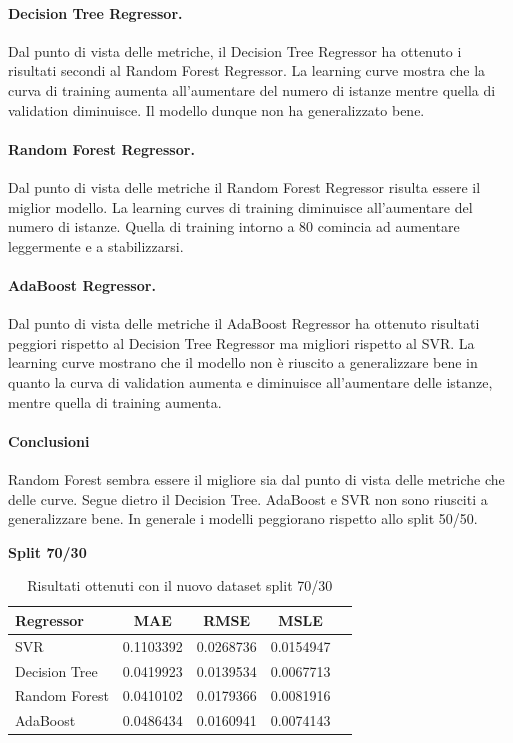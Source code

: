 \paragraph{\textbf{Decision Tree Regressor}.}
Dal punto di vista delle metriche, il Decision Tree Regressor ha ottenuto i risultati secondi al Random Forest Regressor. 
La learning curve mostra che la curva di training aumenta all'aumentare del numero di istanze mentre quella di validation diminuisce. Il modello dunque non ha generalizzato bene.
\paragraph{\textbf{Random Forest Regressor}.}
Dal punto di vista delle metriche il Random Forest Regressor risulta essere il miglior modello.
La learning curves di training diminuisce all'aumentare del numero di istanze. Quella di training intorno a 80 comincia ad aumentare leggermente e a stabilizzarsi.
\paragraph{\textbf{AdaBoost Regressor}.}
Dal punto di vista delle metriche il AdaBoost Regressor ha ottenuto risultati peggiori rispetto al Decision Tree Regressor ma migliori rispetto al SVR.
La learning curve mostrano che il modello non è riuscito a generalizzare bene
in quanto la curva di validation aumenta e diminuisce all'aumentare delle istanze, mentre quella di training aumenta.

\paragraph{\textbf{Conclusioni}} Random Forest sembra essere il migliore sia dal punto di vista delle metriche che delle curve. Segue dietro il Decision Tree. AdaBoost e SVR non sono riusciti a generalizzare bene. In generale i modelli peggiorano rispetto allo split 50/50.
\newpage



\noindent\textbf{Split 70/30}

\begin{table}[H]
    \centering
    \begin{tabular}{|>{\centering\arraybackslash}m{5cm}|c|c|c|c|}
        \hline
        \textbf{Regressor} & \textbf{MAE} & \textbf{RMSE} & \textbf{MSLE} \\ [10pt]
        \hline
        SVR & 0.1103392 & 0.0268736 & 0.0154947 \\ [10pt]
        \hline
        Decision Tree & 0.0419923 & 0.0139534 & 0.0067713 \\ [10pt]
        \hline
        Random Forest & 0.0410102 & 0.0179366 & 0.0081916 \\ [10pt]
        \hline
        AdaBoost & 0.0486434 & 0.0160941 & 0.0074143 \\ [10pt]
        \hline
    \end{tabular}
    \caption{Risultati ottenuti con il nuovo dataset split 70/30}
    \label{tab:results} 
\end{table}

